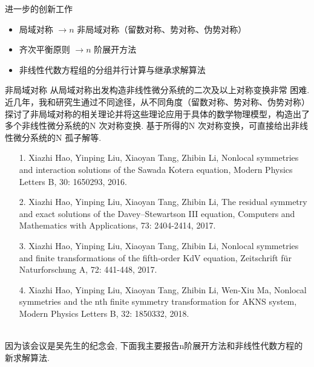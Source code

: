 \documentclass{beamer}
\begin{document}
\begin{frame}{进一步的创新工作}
     \begin{itemize}
      \item  局域对称 $\rightarrow n$ 非局域对称（留数对称、势对称、伪势对称）
      \item  齐次平衡原则 $\rightarrow n$ 阶展开方法
      \item  非线性代数方程组的分组并行计算与继承求解算法
    \end{itemize}
\end{frame}
\begin{frame}{非局域对称}
  从局域对称出发构造非线性微分系统的二次及以上对称变换非常
  困难. 近几年，我和研究生通过不同途径，从不同角度（留数对称、势对称、伪势对称）探讨了非局域对称的相关理论并将这些理论应用于具体的数学物理模型，构造出了多个非线性微分系统的N 次对称变换. 基于所得的N 次对称变换，可直接给出非线性微分系统的N 孤子解等.
  \begin{itemize}
    \item[1.] Xiazhi Hao, Yinping Liu, Xiaoyan Tang, Zhibin Li, Nonlocal symmetries and interaction solutions of the Sawada Kotera equation, Modern Physics Letters B, 30:
    1650293, 2016.
    \item[2.] Xiazhi Hao, Yinping Liu, Xiaoyan Tang, Zhibin Li, The residual symmetry and exact solutions of the Davey–Stewartson III equation, Computers and Mathematics
    with Applications, 73: 2404-2414, 2017.
    \item[3.] Xiazhi Hao, Yinping Liu, Xiaoyan Tang, Zhibin Li, Nonlocal symmetries and finite transformations of the fifth-order KdV equation, Zeitschrift für Naturforschung
    A, 72: 441-448, 2017.
  \end{itemize}
\end{frame}
\begin{frame}
  \begin{itemize}
    \item[4.] Xiazhi Hao, Yinping Liu, Xiaoyan Tang, Zhibin Li, Wen-Xiu Ma, Nonlocal symmetries and the nth finite symmetry transformation for AKNS system, Modern
    Physics Letters B, 32: 1850332, 2018.
  \end{itemize}
\mbox{} \\
    因为该会议是吴先生的纪念会, 下面我主要报告n阶展开方法和非线性代数方程的新求解算法.
\end{frame}

\end{document}
